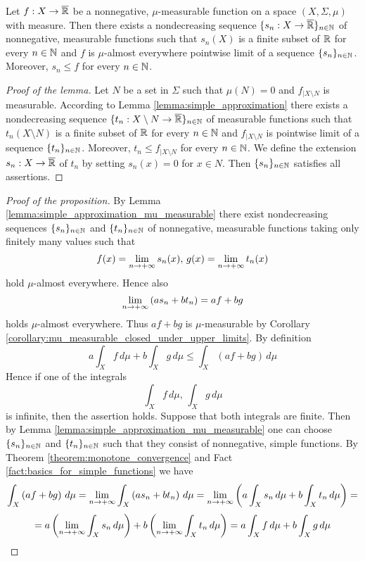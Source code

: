 \begin{lemma}\label{lemma:simple_approximation_mu_measurable}
Let $f:X\rightarrow \overline{{\mathbb R}}$ be a nonnegative, $\mu$-measurable function on a space $(X,\Sigma,\mu)$ with measure. Then there exists a nondecreasing sequence $\{s_n:X\rightarrow \overline{{\mathbb R}}\}_{n\in {\mathbb N}}$ of nonnegative, measurable functions such that $s_n(X)$ is a finite subset of ${\mathbb R}$ for every $n\in {\mathbb N}$ and $f$ is $\mu$-almost everywhere pointwise limit of a sequence $\{s_n\}_{n\in {\mathbb N}}$. Moreover, $s_n\leq f$ for every $n\in {\mathbb N}$.
\end{lemma}
\begin{proof}[Proof of the lemma]
Let $N$ be a set in $\Sigma$ such that $\mu(N) = 0$ and $f_{\mid X\setminus N}$ is measurable. According to Lemma \ref{lemma:simple_approximation} there exists a nondecreasing sequence $\{t_n:X\setminus N\rightarrow \overline{{\mathbb R}}\}_{n\in {\mathbb N}}$ of measurable functions such that $t_n(X\setminus N)$ is a finite subset of ${\mathbb R}$ for every $n\in {\mathbb N}$ and $f_{\mid X\setminus N}$ is pointwise limit of a sequence $\{t_n\}_{n\in {\mathbb N}}$. Moreover, $t_n\leq f_{\mid X\setminus N}$ for every $n\in {\mathbb N}$. We define the extension $s_n:X\rightarrow \overline{{\mathbb R}}$ of $t_n$ by setting $s_n(x) = 0$ for $x\in N$. Then $\{s_n\}_{n\in {\mathbb N}}$ satisfies all assertions. 
\end{proof}

\begin{proof}[Proof of the proposition]
By Lemma \ref{lemma:simple_approximation_mu_measurable} there exist nondecreasing sequences $\{s_n\}_{n\in {\mathbb N}}$ and $\{t_n\}_{n\in {\mathbb N}}$ of nonnegative, measurable functions taking only finitely many values such that $$f(x) = \lim_{n\rightarrow +\infty}s_n(x),\,g(x) = \lim_{n\rightarrow +\infty}t_n(x)$$
hold $\mu$-almost everywhere. Hence also
$$\lim_{n \rightarrow +\infty}\left(as_n + bt_n\right) = af + bg$$
holds $\mu$-almost everywhere. Thus $af+bg$ is $\mu$-measurable by Corollary \ref{corollary:mu_measurable_closed_under_upper_limits}.
By definition
$$a \int_Xf\,d\mu + b \int_Xg\,d\mu \leq \int_X\left(a f+b  g\right)\,d\mu $$
Hence if one of the integrals
$$\int_Xf\,d\mu,\,\int_Xg\,d\mu$$
is infinite, then the assertion holds. Suppose that both integrals are finite. Then by Lemma \ref{lemma:simple_approximation_mu_measurable} one can choose $\{s_n\}_{n\in {\mathbb N}}$ and $\{t_n\}_{n\in {\mathbb N}}$ such that they consist of nonnegative, simple functions. By Theorem \ref{theorem:monotone_convergence} and Fact \ref{fact:basics_for_simple_functions} we have
$$\int_X\left(a f + b g\right)\,d\mu = \lim_{n\rightarrow +\infty}\int_X\left(a s_n + b t_n\right)\,d\mu = \lim_{n\rightarrow +\infty}\left(a \int_Xs_n\,d\mu + b \int_Xt_n\,d\mu\right) =$$
$$=a  \left(\lim_{n\rightarrow +\infty}\int_Xs_n\,d\mu\right) + b \left(\lim_{n\rightarrow +\infty}\int_Xt_n\,d\mu\right) = a \int_Xf\,d\mu + b \int_Xg\,d\mu$$
\end{proof}

